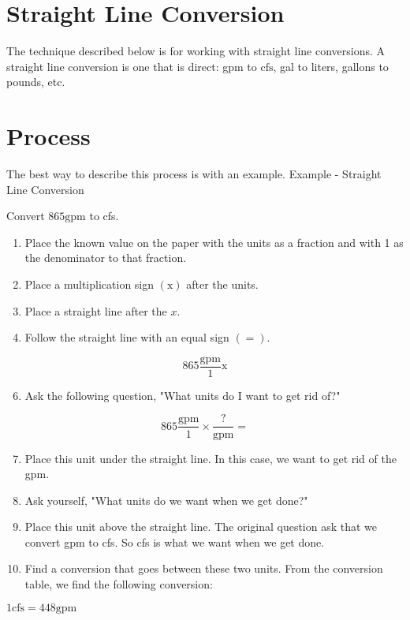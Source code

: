 \section{Straight Line Conversion}
The technique described below is for working with straight line conversions. A straight line conversion is one that is direct: gpm to $\mathrm{cfs}$, gal to liters, gallons to pounds, etc.

\section{Process}
The best way to describe this process is with an example. Example - Straight Line Conversion

Convert $865 \mathrm{gpm}$ to cfs.

\begin{enumerate}
  \item Place the known value on the paper with the units as a fraction and with 1 as the denominator to that fraction.

  \item Place a multiplication sign $(\mathrm{x})$ after the units.

  \item Place a straight line after the $x$.

  \item Follow the straight line with an equal sign $(=)$.

\end{enumerate}
$$
865 \frac{\mathrm{gpm}}{1} \mathrm{x}
$$

\begin{enumerate}
  \setcounter{enumi}{5}
  \item Ask the following question, "What units do I want to get rid of?"
\end{enumerate}
$$
865 \frac{\mathrm{gpm}}{1} \times \frac{?}{\mathrm{gpm}}=
$$

\begin{enumerate}
  \setcounter{enumi}{6}
  \item Place this unit under the straight line. In this case, we want to get rid of the gpm.

  \item Ask yourself, "What units do we want when we get done?"

  \item Place this unit above the straight line. The original question ask that we convert gpm to cfs. So cfs is what we want when we get done.

  \item Find a conversion that goes between these two units. From the conversion table, we find the following conversion:

\end{enumerate}
$1 \mathrm{cfs}=448 \mathrm{gpm}$

